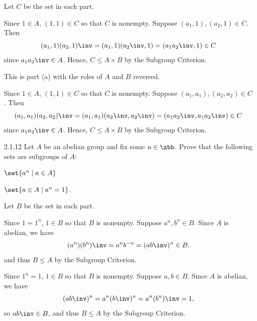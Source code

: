\begin{sol}
    Let $C$ be the set in each part.
    \begin{subexercises}
        \item Since $1 \in A$, $(1, 1) \in C$ so that $C$ is nonempty.
        Suppose $(a_1, 1), (a_2, 1) \in C$.
        Then
        \[
        	(a_1, 1)(a_2, 1)\inv = (a_1, 1)(a_2\inv, 1) = (a_1a_2\inv, 1) \in C
        \]
        since $a_1a_2\inv \in A$.
        Hence, $C \leq A \times B$ by the Subgroup Criterion.
        \item This is part (a) with the roles of $A$ and $B$ reversed.
        \item Since $1 \in A$, $(1, 1) \in C$ so that $C$ is nonempty.
        Suppose $(a_1, a_1), (a_2, a_2) \in C$.
        Then
        \[
        	(a_1, a_1)(a_2, a_2)\inv = (a_1, a_1)(a_2\inv, a_2\inv) = (a_1a_2\inv, a_1a_2\inv) \in C
        \]
        since $a_1a_2\inv \in A$.
	    Hence, $C \leq A \times B$ by the Subgroup Criterion. \qedhere
    \end{subexercises}
\end{sol}

\begin{exercise}{2.1.12}
    Let $A$ be an abelian group and fix some $n \in \zbb$.
	Prove that the following sets are subgroups of $A$:
    \begin{subexercises}
        \item $\set{ a^n \mid a \in A }$
        \item $\set{ a \in A \mid a^n = 1 }$.
    \end{subexercises}
\end{exercise}

\begin{sol}
    Let $B$ be the set in each part.
    \begin{subexercises}
        \item Since $1 = 1^n$, $1 \in B$ so that $B$ is nonempty.
        Suppose $a^n, b^n \in B$.
        Since $A$ is abelian, we have
        \[
        	(a^n)(b^n)\inv = a^n b^{-n} = (ab\inv)^n \in B,
        \]
	    and thus $B \leq A$ by the Subgroup Criterion.
        \item Since $1^n = 1$, $1 \in B$ so that $B$ is nonempty.
        Suppose $a, b \in B$.
        Since $A$ is abelian, we have
        \[
        	(ab\inv)^n = a^n (b\inv)^n = a^n (b^n)\inv = 1,
        \]
        so $ab\inv \in B$, and thus $B \leq A$ by the Subgroup Criterion. \qedhere
    \end{subexercises}
\end{sol}

